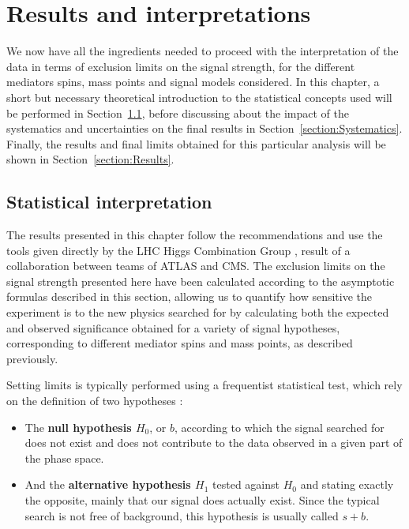 \documentclass[a4paper, 10pt, openright]{report}
\begin{document}
\chapter{Results and interpretations} \label{chapter:FinalResults}

We now have all the ingredients needed to proceed with the interpretation of the data in terms of exclusion limits on the signal strength, for the different mediators spins, mass points and signal models considered. In this chapter, a short but necessary theoretical introduction to the statistical concepts used will be performed in Section~\ref{section:Statistics}, before discussing about the impact of the systematics and uncertainties on the final results in Section~\ref{section:Systematics}. Finally, the results and final limits obtained for this particular analysis will be shown in Section~\ref{section:Results}.

\section{Statistical interpretation} \label{section:Statistics}

The results presented in this chapter follow the recommendations and use the tools given directly by the \ac{LHC} Higgs Combination Group \cite{combine}, result of a collaboration between teams of \ac{ATLAS} and \ac{CMS}. The exclusion limits on the signal strength presented here have been calculated according to the asymptotic formulas described in this section, allowing us to quantify how sensitive the experiment is to the new physics searched for by calculating both the expected and observed significance obtained for a variety of signal hypotheses, corresponding to different mediator spins and mass points, as described previously.

Setting limits is typically performed using a frequentist statistical test, which rely on the definition of two hypotheses \cite{stat1, stat2}: 
 
\begin{itemize} 
\item The \textbf{null hypothesis $H_0$}, or $b$, according to which the signal searched for does not exist and does not contribute to the data observed in a given part of the phase space.
\item And the \textbf{alternative hypothesis $H_1$} tested against $H_0$ and stating exactly the opposite, mainly that our signal does actually exist. Since the typical search
is not free of background, this hypothesis is usually called $s+b$.
\end{itemize}
\end{document}
